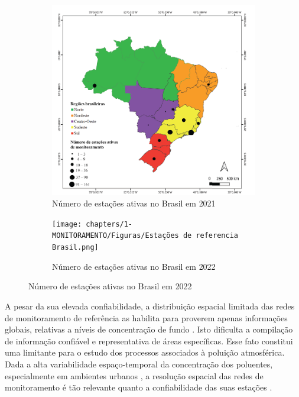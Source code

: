 \begin{figure}[h]
    \centering
    \caption{Estado do monitoramento de referencia da qualidade do ar no Brasil}
    \begin{subfigure}{0.45\textwidth}
        \includegraphics[width=\textwidth]{chapters/1-MONITORAMENTO/Figuras/Monitoramento BR Vormittag.png}
        \caption{Número de estações ativas no Brasil em 2021}
        \label{fig:monit-stations-br-2021}
    \end{subfigure}
    \hfill
    \begin{subfigure}{0.5\textwidth}
        \texttt{[image: chapters/1-MONITORAMENTO/Figuras/Estações de referencia Brasil.png]}
        \caption{Número de estações ativas no Brasil em 2022}
        \label{fig:monit-stations-br-2022}
    \end{subfigure}
    \hfill
    \label{fig:monit-stations-br}
\end{figure}

A pesar da sua elevada confiabilidade, a distribuição espacial limitada das redes de monitoramento de referência as habilita para proverem apenas informações globais, relativas a níveis de concentração de fundo \cite{Kumar2015}. Isto dificulta a compilação de informação confiável e representativa de áreas específicas. Esse fato constitui uma limitante para o estudo dos processos associados à poluição atmosférica. Dada a alta variabilidade espaço-temporal da concentração dos poluentes, especialmente em ambientes urbanos \cite{Mead2013TheNetworks}, a resolução espacial das redes de monitoramento é tão relevante quanto a confiabilidade das suas estações \cite{Jiao2016CommunityStates}.

